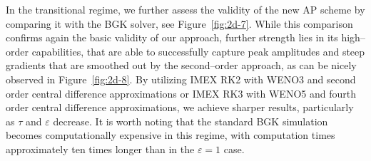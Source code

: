 \documentclass[final,11pt]{siamart251216}
\numberwithin{equation}{section}
\theoremstyle{definition}
\theoremstyle{remark}
\begin{document}
In the transitional regime, we further assess the validity of the new AP scheme by comparing it with the BGK solver, see Figure~\eqref{fig:2d-7}. While this comparison confirms again the basic validity of our approach, further strength lies in its high--order capabilities, that are able to successfully capture peak amplitudes and steep gradients that are smoothed out by the second--order approach, as can be nicely observed
in Figure~\eqref{fig:2d-8}. By utilizing IMEX RK2 with WENO3 and second order central difference approximations or IMEX RK3 with WENO5 and fourth order central difference approximations, we achieve sharper results, particularly as $\tau$ and $\varepsilon$ decrease.  
It is worth noting that the standard BGK simulation becomes computationally expensive in this regime, with computation times approximately ten times longer than in the $\varepsilon=1$ case.
\end{document}
